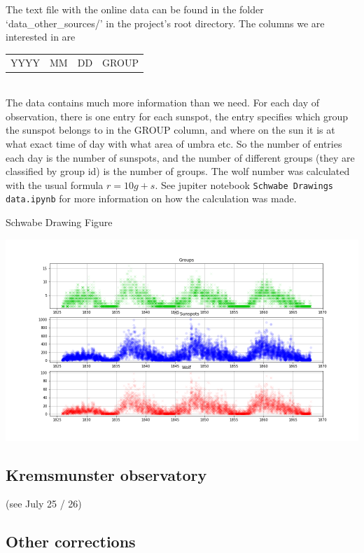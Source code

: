 \documentclass[12pt]{article}
\begin{document}
The text file with the online data can be found in the folder `data\_other\_sources/' in the project's root directory. The columns we are interested in are \\

{\centering
\begin{tabular}{c|c|c|c}
    YYYY & MM & DD & GROUP 
\end{tabular}
\par}\\

The data contains much more information than we need. For each day of observation, there is one entry for each sunspot, the entry specifies which group the sunspot belongs to in the GROUP column, and where on the sun it is at what exact time of day with what area of umbra etc. So the number of entries each day is the number of sunspots, and the number of different groups (they are classified by group id) is the number of groups. The wolf number was calculated with the usual formula $r = 10g + s$. See jupiter notebook \texttt{Schwabe Drawings data.ipynb} for more information on how the calculation was made. \\

{\centering
\caption{Schwabe Drawing Figure}
\includegraphics[width=\linewidth]{Schwabe-Drawing.png}
\label{fig:schwabe drawing}
\par}


\subsection{Kremsmunster observatory}
(see July 25 / 26)

\subsection{Other corrections}
\end{document}
